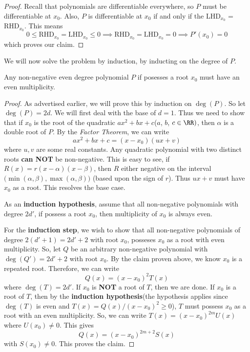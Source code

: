 \documentclass[numbers=endperiod, 11pt]{scrartcl}
\begin{document}
\begin{sol}
\begin{proof}
        Recall that polynomials are differentiable
        everywhere, so $P$ must be differentiable at $x_0$.
        Also, $P$ is differentiable at $x_0$ if and only if
        the LHD$_{x_0}$ = RHD$_{x_0}$. This means
        \[ 0 \le \text{RHD}_{x_0} = \text{LHD}_{x_0} \le 0 \implies \text{RHD}_{x_0} = \text{LHD}_{x_0} = 0 \implies P'(x_0) = 0 \]
        which proves our claim.
    \end{proof}

    We will now solve the problem by induction, by
    inducting on the degree of $P$.

    \begin{claim*}
        Any non-negative even degree polynomial $P$ if
        posesses a root $x_0$ must have an even
        multiplicity.
    \end{claim*}
    \begin{proof}
        As advertised earlier, we will prove this by
        induction on $\deg(P)$. So let $\deg(P) = 2d$.
        We will first deal with the base of $d = 1$.
        Thus we need to show that if $x_0$ is the root
        of the quadratic
        $ax^2 + bx + c$($a$, $b$, $c \in \RR)$, then
        $\alpha$ is a double root of $P$. By the
        \emph{Factor Theorem}, we can write
        \[ ax^2 + bx + c = (x-x_0)(ux + v) \]
        where $u,v$ are some real constants. Any quadratic
        polynomial with two distinct roots \textbf{can NOT}
        be non-negative. This is easy to see, if
        $R(x) = r(x-\alpha)(x-\beta)$, then $R$ either
        negative on the interval
        $\big( \min(\alpha,\beta), \max(\alpha, \beta) \big)$
        (based upon the sign of $r$).
        Thus $ux + v$ must have $x_0$ as a root. This
        resolves the base case.

        As an \textbf{induction hypothesis}, assume that
        all non-negative polynomials with degree $2d'$,
        if possess a root $x_0$, then multiplicity of
        $x_0$ is always even.

        For the \textbf{induction step}, we wish to
        show that all non-negative polynomials of degree
        $2(d'+1) = 2d' + 2$	with root $x_0$, posseses
        $x_0$ as a root with even multiplicity. So, let
        $Q$ be an arbitrary non-negative polynomial with
        $\deg(Q') = 2d' + 2$ with root $x_0$. By the
        claim proven above, we know $x_0$ is a repeated
        root. Therefore, we can write
        \[Q(x) = (x-x_0)^2 T(x) \]
        where $\deg(T) = 2d'$. If $x_0$ is \textbf{NOT} a
        root of $T$, then we are done. If $x_0$ is a root
        of $T$, then by the \textbf{induction hypothesis}(the
        hypothesis applies since $\deg(T)$ is even and
        $T(x) = Q(x)/(x-x_0)^2 \ge 0$),
        $T$ must possess $x_0$ as a root with an even
        multiplicity. So, we can write
        $T(x) = (x-x_0)^{2m}U(x)$ where $U(x_0) \ne 0$.
        This gives
        \[Q(x) = (x-x_0)^{2m+2} S(x) \]
        with $S(x_0) \ne 0$. This proves the claim.
    \end{proof}


\end{sol}
\end{document}
